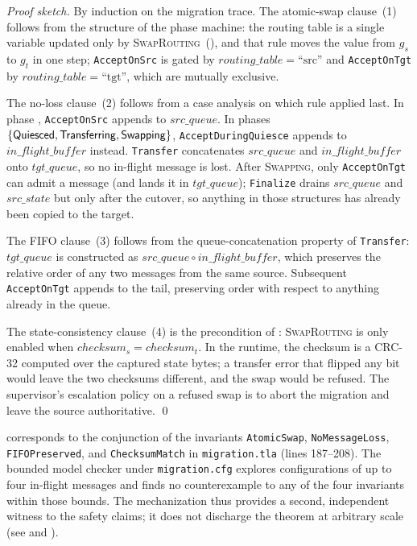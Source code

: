 \begin{proof}[Proof sketch]
By induction on the migration trace.  The atomic-swap clause~(1)
follows from the structure of the phase machine: the routing table
is a single variable updated only by
\textsc{SwapRouting}~(), and that rule
moves the value from \(g_s\) to \(g_t\) in one step;
\texttt{AcceptOnSrc} is gated by
\(\mathit{routing\_table} = \text{``src''}\) and
\texttt{AcceptOnTgt} by \(\mathit{routing\_table} = \text{``tgt''}\),
which are mutually exclusive.

The no-loss clause~(2) follows from a case analysis on which rule
applied last.  In phase ,
\texttt{AcceptOnSrc} appends to \(\mathit{src\_queue}\).  In phases
\(\{\mathsf{Quiesced}, \mathsf{Transferring}, \mathsf{Swapping}\}\),
\texttt{AcceptDuringQuiesce} appends to
\(\mathit{in\_flight\_buffer}\) instead.  \texttt{Transfer}
concatenates \(\mathit{src\_queue}\) and
\(\mathit{in\_flight\_buffer}\) onto \(\mathit{tgt\_queue}\), so no
in-flight message is lost.  After \textsc{Swapping}, only
\texttt{AcceptOnTgt} can admit a message (and lands it in
\(\mathit{tgt\_queue}\)); \texttt{Finalize} drains
\(\mathit{src\_queue}\) and \(\mathit{src\_state}\) but only after
the cutover, so anything in those structures has already been
copied to the target.

The FIFO clause~(3) follows from the queue-concatenation property
of \texttt{Transfer}: \(\mathit{tgt\_queue}\) is constructed as
\(\mathit{src\_queue} \mathbin{\circ} \mathit{in\_flight\_buffer}\),
which preserves the relative order of any two messages from the
same source.  Subsequent \texttt{AcceptOnTgt} appends to the tail,
preserving order with respect to anything already in the queue.

The state-consistency clause~(4) is the precondition of
: \textsc{SwapRouting} is only enabled
when \(\mathit{checksum}_s = \mathit{checksum}_t\).  In the
runtime, the checksum is a CRC-32 computed over the captured state
bytes; a transfer error that flipped any bit would leave the two
checksums different, and the swap would be refused.  The
supervisor's escalation policy on a refused swap is to abort the
migration and leave the source authoritative.
\qed
\end{proof}

 corresponds to the conjunction of the
\TLA{} invariants \texttt{AtomicSwap}, \texttt{NoMessageLoss},
\texttt{FIFOPreserved}, and \texttt{ChecksumMatch} in
\texttt{migration.tla} (lines 187--208).  The bounded model checker
under \texttt{migration.cfg} explores configurations of up to four
in-flight messages and finds no counterexample to any of the four
invariants within those bounds.  The mechanization thus provides a
second, independent witness to the safety claims; it does not
discharge the theorem at arbitrary scale (see
 and ).

